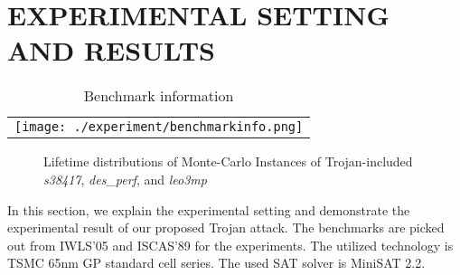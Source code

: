 \section{EXPERIMENTAL SETTING AND RESULTS}
\label{sec:mot}

\begin{table}
\centering
\caption{Benchmark information}
	\begin{tabular}{l}
	\texttt{[image: ./experiment/benchmarkinfo.png]}
	\end{tabular}
\label{table:benchmark}
\end{table}

\begin{figure*}[!ht]
    \centering
    \hspace{0.1cm}
    \hspace{0.1cm}
    \hspace{0.1cm}
    \caption{Lifetime distributions of Monte-Carlo Instances of Trojan-included \textit{s38417}, \textit{des\_perf}, and \textit{leo3mp}}
    \label{fig:exp}
\end{figure*}


In this section, we explain the experimental setting and demonstrate the experimental result of our proposed Trojan attack. The benchmarks are picked out from IWLS'05 and ISCAS'89 for the experiments. The utilized technology is TSMC 65nm GP standard cell series. The used SAT solver is MiniSAT 2.2. %


